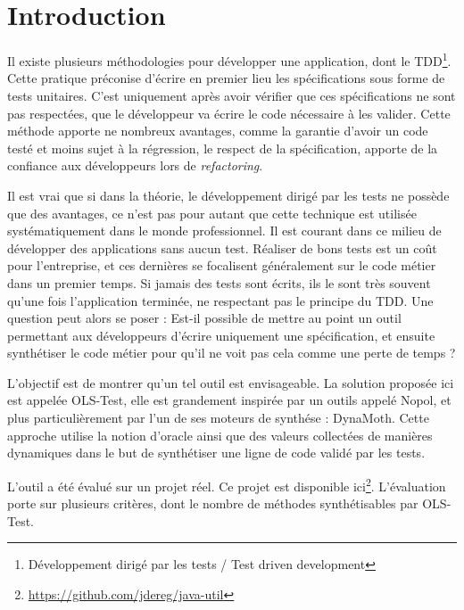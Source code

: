\chapter*{Introduction}
	\thispagestyle{introduction}


\par Il existe plusieurs méthodologies pour développer une application, dont le TDD\footnote{Développement dirigé par les tests / Test driven development}. Cette pratique préconise d'écrire en premier lieu les spécifications sous forme de tests unitaires. C'est uniquement après avoir vérifier que ces spécifications ne sont pas respectées, que le développeur va écrire le code nécessaire à les valider. Cette méthode apporte ne nombreux avantages, comme la garantie d'avoir un code testé et moins sujet à la régression, le respect de la spécification, apporte de la confiance aux développeurs lors de \textit{refactoring}.\newline

\par Il est vrai que si dans la théorie, le développement dirigé par les tests ne possède que des avantages, ce n'est pas pour autant que cette technique est utilisée systématiquement dans le monde professionnel. Il est courant dans ce milieu de développer des applications sans aucun test. Réaliser de bons tests est un coût pour l'entreprise, et ces dernières se focalisent généralement sur le code métier dans un premier temps. Si jamais des tests sont écrits, ils le sont très souvent qu'une fois l'application terminée, ne respectant pas le principe du TDD. Une question peut alors se poser : Est-il possible de mettre au point un outil permettant aux développeurs d'écrire uniquement une spécification, et ensuite synthétiser le code métier pour qu'il ne voit pas cela comme une perte de temps ?
\newline

\par L'objectif est de montrer qu'un tel outil est envisageable. La solution proposée ici est appelée OLS-Test, elle est grandement inspirée par un outils appelé Nopol\cite{nopol}, et plus particulièrement par l'un de ses moteurs de synthése : DynaMoth\cite{dynamoth}. Cette approche utilise la notion d'oracle ainsi que des valeurs collectées de manières dynamiques dans le but de synthétiser une ligne de code validé par les tests.
\newline

\par L'outil a été évalué sur un projet réel. Ce projet est disponible ici\footnote{\url{https://github.com/jdereg/java-util}}. L'évaluation porte sur plusieurs critères, dont le nombre de méthodes synthétisables par OLS-Test.
